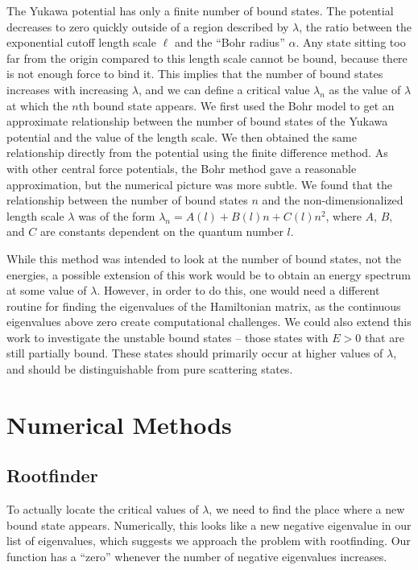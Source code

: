 \documentclass[12pt,twoside]{reedthesis}
\begin{document}
The Yukawa potential has only a finite number of bound states. The potential decreases to zero quickly outside of a region described by $\lambda$, the ratio between the exponential cutoff length scale $\ell$ and the ``Bohr radius'' $\alpha$. Any state sitting too far from the origin compared to this length scale cannot be bound, because there is not enough force to bind it. This implies that the number of bound states increases with increasing $\lambda$, and we can define a critical value $\lambda_n$ as the value of $\lambda$ at which the $n$th bound state appears.
We first used the Bohr model to get an approximate relationship between the number of bound states of the Yukawa potential and the value of the length scale. We then obtained the same relationship directly from the potential using the finite difference method. As with other central force potentials, the Bohr method gave a reasonable approximation, but the numerical picture was more subtle. 
We found that the relationship between the number of bound states $n$ and the non-dimensionalized length scale $\lambda$ was of the form $\lambda_n = A(l) + B(l)n + C(l)n^2$, where $A$, $B$, and $C$ are constants dependent on the quantum number $l$. 

While this method was intended to look at the number of bound states, not the energies, a possible extension of this work would be to obtain an energy spectrum at some value of $\lambda$. However, in order to do this, one would need a different routine for finding the eigenvalues of the Hamiltonian matrix, as the continuous eigenvalues above zero create computational challenges.
We could also extend this work to investigate the unstable bound states -- those states with $E > 0$ that are still partially bound. These states should primarily occur at higher values of $\lambda$, and should be distinguishable from pure scattering states. 


%
\appendix
\chapter{Numerical Methods}

\section{Rootfinder}

To actually locate the critical values of $\lambda$, we need to find the place where a new bound state appears. Numerically, this looks like a new negative eigenvalue in our list of eigenvalues, which suggests we approach the problem with rootfinding. Our function has a ``zero'' whenever the number of negative eigenvalues increases.
\end{document}
